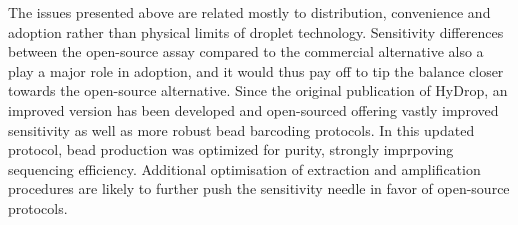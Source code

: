 The issues presented above are related mostly to distribution, convenience and adoption rather than physical limits of droplet technology. Sensitivity differences between the open-source assay compared to the commercial alternative also a play a major role in adoption, and it would thus pay off to tip the balance closer towards the open-source alternative. Since the original publication of HyDrop, an improved version has been developed and open-sourced offering vastly improved sensitivity as well as more robust bead barcoding protocols. In this updated protocol, bead production was optimized for purity, strongly imprpoving sequencing efficiency. Additional optimisation of extraction and amplification procedures are likely to further push the sensitivity needle in favor of open-source protocols.